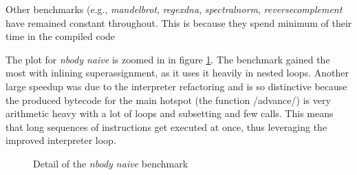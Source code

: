 
Other benchmarks (e.g., \emph{mandelbrot}, \emph{regexdna}, \emph{spectralnorm}, \emph{reversecomplement} have remained constant throughout. This is because they spend minimum of their time in the compiled code


The plot for \emph{nbody naive} is zoomed in in figure \ref{fig:nbody}. The benchmark gained the most with inlining superassignment, as it uses it heavily in nested loops. Another large speedup was due to the interpreter refactoring and is so distinctive because the produced bytecode for the main hotspot (the function \rinline/advance/) is very arithmetic heavy with a lot of loops and subsetting and few calls. This means that long sequences of instructions get executed at once, thus leveraging the improved interpreter loop.





\begin{figure}[htbp]
  \caption{\label{fig:nbody}Detail of the \emph{nbody naive} benchmark}
  \centering
\end{figure}

